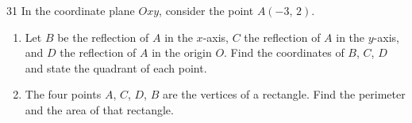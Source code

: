 \clearpage
{}

\begin{probbox}{31}{\relax}
In the coordinate plane $Oxy$, consider the point $A(-3,\,2)$.
\begin{enumerate}[label=\alph*),leftmargin=1.6em,itemsep=0pt,topsep=2pt]
  \item Let $B$ be the reflection of $A$ in the $x$-axis, $C$ the reflection of $A$ in the $y$-axis, and $D$ the reflection of $A$ in the origin $O$. Find the coordinates of $B$, $C$, $D$ and state the quadrant of each point.
  \item The four points $A$, $C$, $D$, $B$ are the vertices of a rectangle. Find the perimeter and the area of that rectangle.
\end{enumerate}
\end{probbox}
